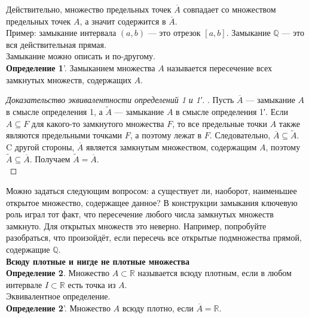 \documentclass{report}
\begin{document}
Действительно, множество предельных точек $\overline{A}$ совпадает со множеством предельных точек $A$, а значит содержится в $\overline{A}$. \\

Пример: замыкание интервала $(a, b)$ — это отрезок $[a,b]$. Замыкание $\mathbb{Q}$ — это вся действительная прямая. \\

Замыкание можно описать и по-другому. \\

\textbf{Определение 1}'. Замыканием множества $A$ называется пересечение всех замкнутых множеств, содержащих $A$.\\ 

\begin{proof}[Доказательство эквивалентности определений 1 и 1′]. Пусть $\overline{A}$ — замыкание $A$ в смысле определения 1, а $\widetilde{A}$ — замыкание $A$ в смысле определения 1′. Если $A \subseteq F$ для какого-то замкнутого множества $F$, то все предельные точки $A$ также являются предельными точками $F$, а поэтому лежат в $F$. Следовательно, $\overline{A} \subseteq \widetilde{A}$.\\

C другой стороны, $\overline{A}$ является замкнутым множеством, содержащим $A$, поэтому $\widetilde{A} \subseteq \overline{A}$. Получаем $\widetilde{A} = \overline{A}$.\\
\end{proof}

Можно задаться следующим вопросом: а существует ли, наоборот, наименьшее открытое множество, содержащее данное? В конструкции замыкания ключевую роль играл тот факт, что пересечение любого числа замкнутых множеств замкнуто. Для открытых множеств это неверно. Например, попробуйте разобраться, что произойдёт, если пересечь все открытые подмножества прямой, содержащие $\mathbb{Q}$. \\

\textbf{Всюду плотные и нигде не плотные множества 
}\\

\textbf{Определение 2}. Множество $A \subset \mathbb{R}$ называется всюду плотным, если в любом интервале $I \subset \mathbb{R}$ есть точка из $A$. \\

Эквивалентное определение.\\

\textbf{Определение 2}'. Множество $A$ всюду плотно, если $\overline{A} = \mathbb{R}$. \\
\end{document}
